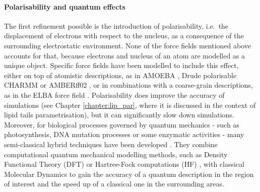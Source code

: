\paragraph{Polarisability and quantum effects}
The first refinement possible is the introduction of polarisability, i.e.\ the displacement of electrons with respect to the nucleus, as a consequence of the surrounding electrostatic environment. None of the force fields mentioned above accounts for that, because electrons and nucleus of an atom are modelled as a unique object. Specific force fields have been modelled to include this effect, either on top of atomistic descriptions, as in AMOEBA \cite{Ren2003,Ponder2010}, Drude polarisable CHARMM \cite{Anisimov2004} or AMBERff02 \cite{Cieplak2001}, or in combinations with a coarse-grain descriptions, as in the ELBA force field \cite{Orsi2011}. Polarisability does improve the accuracy of simulations (see Chapter \ref{chapter:lip_par}, where it is discussed in the context of lipid tails parametrisation), but it can significantly slow down simulations.
%
Moreover, for biological processes governed by quantum mechanics - such as photosynthesis, DNA mutation processes or some enzymatic activities - many semi-classical hybrid techniques have been developed \cite{Ahmadi2018}. They combine computational quantum mechanical modelling methods, such as Density Functional Theory (DFT) or Hartree-Fock computations (HF) \cite{Shao2015}, with classical Molecular Dynamics to gain the accuracy of a quantum description in the region of interest and the speed up of a classical one in the surrounding areas.

